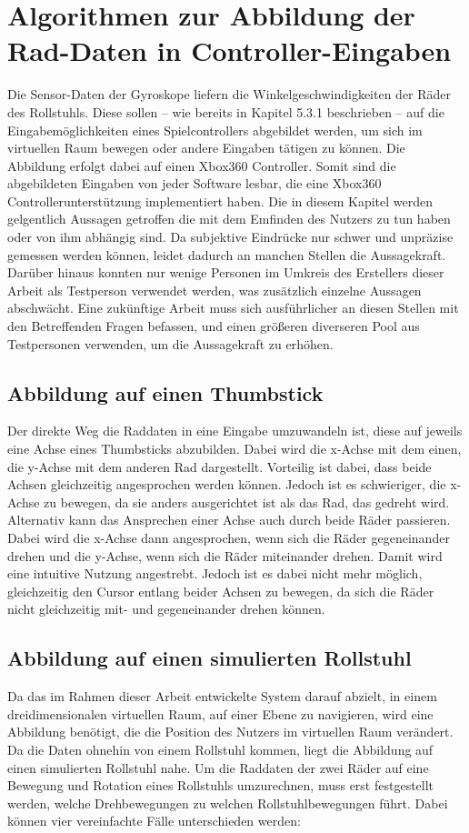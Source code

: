 \section{Algorithmen zur Abbildung der Rad-Daten in Controller-Eingaben}
Die Sensor-Daten der Gyroskope liefern die Winkelgeschwindigkeiten der Räder des Rollstuhls.
Diese sollen – wie bereits in Kapitel 5.3.1 beschrieben – auf die Eingabemöglichkeiten eines Spielcontrollers abgebildet werden, um sich im virtuellen Raum bewegen oder andere Eingaben tätigen zu können.
Die Abbildung erfolgt dabei auf einen Xbox360 Controller. Somit sind die abgebildeten Eingaben von jeder Software lesbar, die eine Xbox360 Controllerunterstützung implementiert haben.
Die in diesem Kapitel werden gelgentlich Aussagen getroffen die mit dem Emfinden des Nutzers zu tun haben oder von ihm abhängig sind.
Da subjektive Eindrücke nur schwer und unpräzise gemessen werden können, leidet dadurch an manchen Stellen die Aussagekraft.
Darüber hinaus konnten nur wenige Personen im Umkreis des Erstellers dieser Arbeit als Testperson verwendet werden, was zusätzlich einzelne Aussagen abschwächt.
Eine zukünftige Arbeit muss sich ausführlicher an diesen Stellen mit den Betreffenden Fragen befassen, und einen größeren diverseren Pool aus Testpersonen verwenden, um die Aussagekraft zu erhöhen.

\subsection{Abbildung auf einen Thumbstick}
Der direkte Weg die Raddaten in eine Eingabe umzuwandeln ist, diese auf jeweils eine Achse eines Thumbsticks abzubilden.
Dabei wird die x-Achse mit dem einen, die y-Achse mit dem anderen Rad dargestellt.
Vorteilig ist dabei, dass beide Achsen gleichzeitig angesprochen werden können.
Jedoch ist es schwieriger, die x-Achse zu bewegen, da sie anders ausgerichtet ist als das Rad, das gedreht wird.
Alternativ kann das Ansprechen einer Achse auch durch beide Räder passieren.
Dabei wird die x-Achse dann angesprochen, wenn sich die Räder gegeneinander drehen und die y-Achse, wenn sich die Räder miteinander drehen.
Damit wird eine intuitive Nutzung angestrebt.
Jedoch ist es dabei nicht mehr möglich, gleichzeitig den Cursor entlang beider Achsen zu bewegen, da sich die Räder nicht gleichzeitig mit- und gegeneinander drehen können.

\subsection{Abbildung auf einen simulierten Rollstuhl}
Da das im Rahmen dieser Arbeit entwickelte System darauf abzielt, in einem dreidimensionalen virtuellen Raum, auf einer Ebene zu navigieren, wird eine Abbildung benötigt, die die Position des Nutzers im virtuellen Raum verändert.
Da die Daten ohnehin von einem Rollstuhl kommen, liegt die Abbildung auf einen simulierten Rollstuhl nahe.
Um die Raddaten der zwei Räder auf eine Bewegung und Rotation eines Rollstuhls umzurechnen, muss erst festgestellt werden, welche Drehbewegungen zu welchen Rollstuhlbewegungen führt.
Dabei können vier vereinfachte Fälle unterschieden werden:

